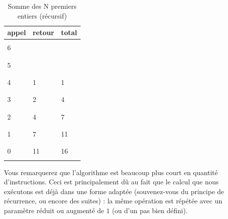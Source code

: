 \documentclass[11pt,a4paper]{article}
\begin{document}
\begin{table}[h!]
\begin{minipage}{0.13\textwidth}
  \end{minipage}
  \hfillx
  \begin{minipage}{0.24\textwidth}
    \centering
    \begin{tabular}{|C{1cm}|C{1cm}|C{1cm}|}
        \hline
        appel & retour & total \\
        \hline
              &        & \\
        6     &        & \\
              &        & \\
        \hline
              &        & \\
        5     &        & \\
              &        & \\
        \hline
              &        & \\
        4     &   1    &  1 \\
              &        & \\
        \hline
              &        & \\
        3     &   2    & 4 \\
              &        & \\
        \hline
              &        & \\
        2     &   4    & 7 \\
              &        & \\
        \hline
              &        & \\
        1     &   7    & 11 \\
              &        & \\
        \hline
              &        & \\
        0     &   11   & 16 \\
              &        & \\
        \hline
    \end{tabular}
  \end{minipage}
  \caption{Somme des N premiers entiers (récursif)}
  \label{somme-n-premiers-entiers-recursif}
\end{table}


\bigskip

Vous remarquerez que l'algorithme est beaucoup plus court en quantité d'instructions.
Ceci est principalement dû au fait que le calcul que nous exécutons est déjà dans une forme adaptée (souvenez-vous du principe de récurrence, ou encore des suites) : la même opération est répétée avec un paramètre réduit ou augmenté de $ 1 $ (ou d'un pas bien défini).
\end{document}
